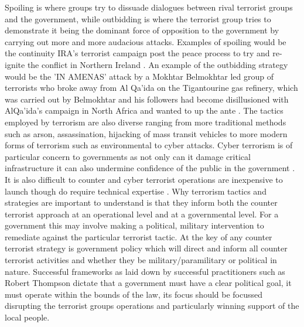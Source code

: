 Spoiling is where groups try to dissuade dialogues between rival terrorist groups and the government, while outbidding is where the terrorist group tries to demonstrate it being the dominant force of opposition to the government by carrying out more and more audacious attacks. Examples of spoiling would be the continuity IRA's terrorist campaign post the peace process to try and re-ignite the conflict in Northern Ireland \citep{whiting2015spoiling}. An example of the outbidding strategy would be the 'IN AMENAS' attack by a Mokhtar Belmokhtar led group of terrorists who broke away from Al Qa'ida on the Tigantourine gas refinery, which was carried out by Belmokhtar and his followers had become disillusioned with AlQa'ida's campaign in North Africa and wanted to up the ante \citep{watling2015ctc}. 
The tactics employed by terrorism are also diverse ranging from more traditional methods such as arson, assassination, hijacking of mass transit vehicles to more modern forms of terrorism such as environmental to cyber attacks. Cyber terrorism is of particular concern to governments as not only can it damage critical infrastructure it can also undermine confidence of the public in the government \citep{gross2016cyber}. It is also difficult to counter and cyber terrorist operations are inexpensive to launch though do require technical expertise \citep{blakemore2016policing}.
Why terrorism tactics and strategies are important to understand is that they inform both the counter terrorist approach at an operational level and at a governmental level.  For a government this may involve making a political, military intervention to remediate against the particular terrorist tactic. 
At the key of any counter terrorist strategy is government policy which will direct and inform all counter terrorist activities and whether they be military/paramilitary or political in nature. Successful frameworks as laid down by successful practitioners such as Robert Thompson dictate that a government must have a clear political goal, it must operate within the bounds of the law, its focus should be focussed disrupting the terrorist groups operations and particularly winning support of the local people. 

